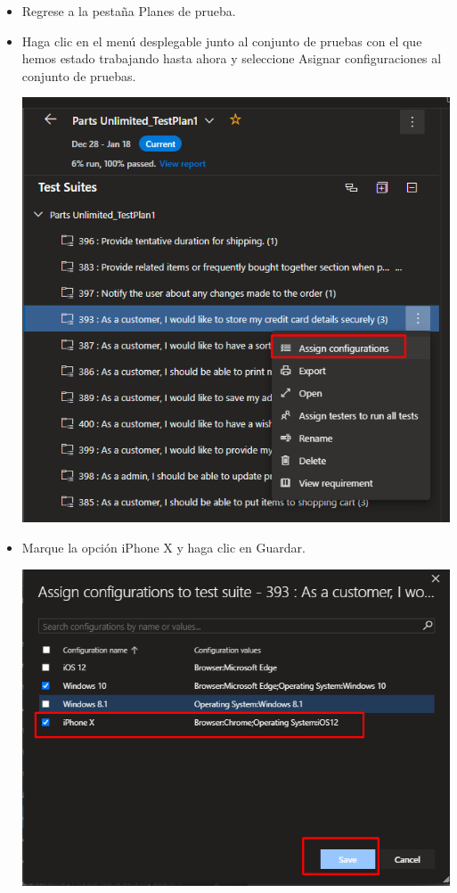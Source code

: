 \begin{itemize}
\item Regrese a la pestaña Planes de prueba.
\item Haga clic en el menú desplegable junto al conjunto de pruebas con el que hemos estado trabajando hasta ahora y seleccione Asignar configuraciones al conjunto de pruebas.
\begin{center}
\includegraphics[width=\columnwidth]{images/13}\newline
\end{center}

\item Marque la opción iPhone X y haga clic en Guardar.
\begin{center}
\includegraphics[width=\columnwidth]{images/47}\newline
\end{center}


\end{itemize}
